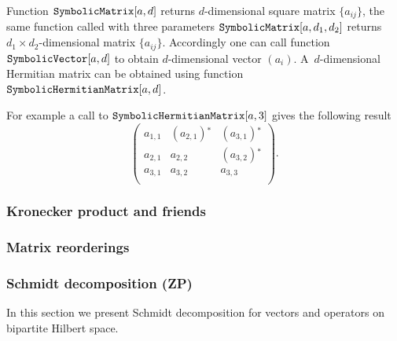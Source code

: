 \documentclass[11pt,a4paper]{article}
\newcommand{\1}{{\bf 1}}
\newcommand{\fname}[1]{\text{\texttt{#1}}}
\begin{document}
Function $\fname{SymbolicMatrix}[a,d]$ returns $d$-dimensional square matrix 
$\{a_{ij}\}$, the same function called with three parameters 
$\fname{SymbolicMatrix}[a,d_1,d_2]$ returns $d_1 \times d_2$-dimensional 
matrix $\{a_{ij}\}$. Accordingly one can call function 
$\fname{SymbolicVector}[a,d]$ to obtain $d$-dimensional vector $(a_i)$.
A~$d$-dimensional Hermitian matrix can be obtained using function 
$\fname{SymbolicHermitianMatrix}[a,d]$. 

For example a call to $\fname{SymbolicHermitianMatrix}[a,3]$ gives the 
following result
\begin{equation}
\left(
\begin{array}{ccc}
 a_{1,1} & \left(a_{2,1}\right){}^* & \left(a_{3,1}\right){}^* \\
 a_{2,1} & a_{2,2} & \left(a_{3,2}\right){}^* \\
 a_{3,1} & a_{3,2} & a_{3,3} \\
\end{array}
\right).
\end{equation}


\subsubsection{Kronecker product and friends}

\subsubsection{Matrix reorderings}

\subsubsection{Schmidt decomposition (ZP)}
In this section we present Schmidt decomposition for vectors and operators
on bipartite Hilbert space.
\end{document}
